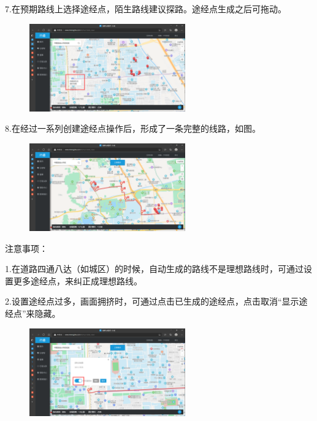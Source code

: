 \documentclass{ctexbook}
\begin{document}
7.在预期路线上选择途经点，陌生路线建议探路。途经点生成之后可拖动。
       \begin{figure}[H]
            \begin{center}
            \includegraphics[width=0.6\textwidth]{fig/行者7}
            \end{center}
        \end{figure}

8.在经过一系列创建途经点操作后，形成了一条完整的线路，如图。
       \begin{figure}[H]
            \begin{center}
            \includegraphics[width=0.6\textwidth]{fig/行者8}
            \end{center}
        \end{figure}

注意事项：

1.在道路四通八达（如城区）的时候，自动生成的路线不是理想路线时，可通过设置更多途经点，来纠正成理想路线。

2.设置途经点过多，画面拥挤时，可通过点击已生成的途经点，点击取消“显示途经点”来隐藏。
       \begin{figure}[H]
            \begin{center}
            \includegraphics[width=0.6\textwidth]{fig/行者9}
            \end{center}
        \end{figure}
\end{document}
